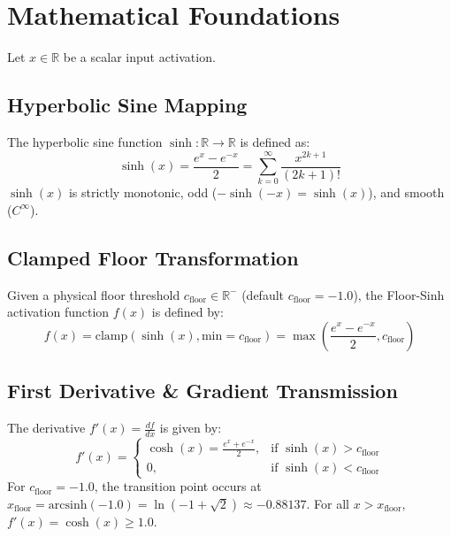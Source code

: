\section{Mathematical Foundations}

Let $x \in \mathbb{R}$ be a scalar input activation.

\subsection{Hyperbolic Sine Mapping}
The hyperbolic sine function $\sinh: \mathbb{R} \to \mathbb{R}$ is defined as:
\begin{equation}
\sinh(x) = \frac{e^x - e^{-x}}{2} = \sum_{k=0}^{\infty} \frac{x^{2k+1}}{(2k+1)!}
\end{equation}
$\sinh(x)$ is strictly monotonic, odd ($-\sinh(-x) = \sinh(x)$), and smooth ($C^{\infty}$).

\subsection{Clamped Floor Transformation}
Given a physical floor threshold $c_{\text{floor}} \in \mathbb{R}^-$ (default $c_{\text{floor}} = -1.0$), the Floor-Sinh activation function $f(x)$ is defined by:
\begin{equation}
f(x) = \text{clamp}(\sinh(x), \text{min}=c_{\text{floor}}) = \max\left( \frac{e^x - e^{-x}}{2}, c_{\text{floor}} \right)
\end{equation}

\subsection{First Derivative \& Gradient Transmission}
The derivative $f'(x) = \frac{df}{dx}$ is given by:
\begin{equation}
f'(x) = \begin{cases}
\cosh(x) = \frac{e^x + e^{-x}}{2}, & \text{if } \sinh(x) > c_{\text{floor}} \\
0, & \text{if } \sinh(x) < c_{\text{floor}}
\end{cases}
\end{equation}
For $c_{\text{floor}} = -1.0$, the transition point occurs at $x_{\text{floor}} = \text{arcsinh}(-1.0) = \ln(-1 + \sqrt{2}) \approx -0.88137$. For all $x > x_{\text{floor}}$, $f'(x) = \cosh(x) \ge 1.0$.
